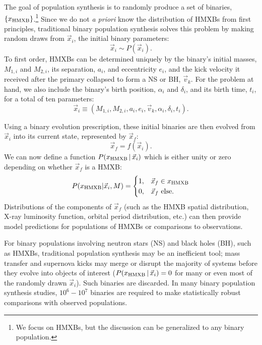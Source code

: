 \documentclass[usenatbib]{mnras}
\newcommand{\given}{\,|\,}
\begin{document}
The goal of population synthesis is to randomly produce a set of binaries, $\{x_{\rm HMXB}\}$.\footnote{We focus on HMXBs, but the discussion can be generalized to any binary population.} Since we do not {\it a priori} know the distribution of HMXBs from first principles, traditional binary population synthesis solves this problem by making random draws from $\vec{x}_i$, the initial binary parameters:
\begin{equation}
\vec{x}_i \sim P(\vec{x}_i).
\end{equation}
To first order, HMXBs can be determined uniquely by the binary's initial masses, $M_{1,i}$ and $M_{2,i}$, its separation, $a_i$, and eccentricity $e_i$, and the kick velocity it received after the primary collapsed to form a NS or BH, $\vec{v}_k$. For the problem at hand, we also include the binary's birth position, $\alpha_i$ and $\delta_i$, and its birth time, $t_i$, for a total of ten parameters:
\begin{equation}
\vec{x}_i \equiv ( M_{1,i}, M_{2,i}, a_i, e_i, \vec{v}_k, \alpha_i, \delta_i, t_i ). \label{eq:x_i}
\end{equation}


Using a binary evolution prescription, these initial binaries are then evolved from $\vec{x}_i$ into its current state, represented by $\vec{x}_f$:
\begin{equation}
\vec{x}_f = f(\vec{x}_i). \label{eq:xf_xi}
\end{equation}
We can now define a function $P(x_{\rm HMXB} \given \vec{x}_i)$ which is either unity or zero depending on whether $\vec{x}_f$ is a HMXB:
\begin{equation}
P(x_{\rm HMXB} | \vec{x}_i, M) = 
\begin{cases}
1, & \vec{x}_f \in x_{\rm HMXB} \\
0, & \vec{x}_f\ {\rm else}.
\end{cases}
\end{equation}
Distributions of the components of $\vec{x}_f$ (such as the HMXB spatial distribution, X-ray luminosity function, orbital period distribution, etc.) can then provide model predictions for populations of HMXBs or comparisons to observations.




For binary populations involving neutron stars (NS) and black holes (BH), such as HMXBs, traditional population synthesis may be an inefficient tool; mass transfer and supernova kicks may merge or disrupt the majority of systems before they evolve into objects of interest ($P(x_{\rm HMXB} \given \vec{x}_i) = 0$ for many or even most of the randomly drawn $\vec{x}_i$). Such binaries are discarded. In many binary population synthesis studies, $10^6-10^7$ binaries are required to make statistically robust comparisons with observed populations.
\end{document}
